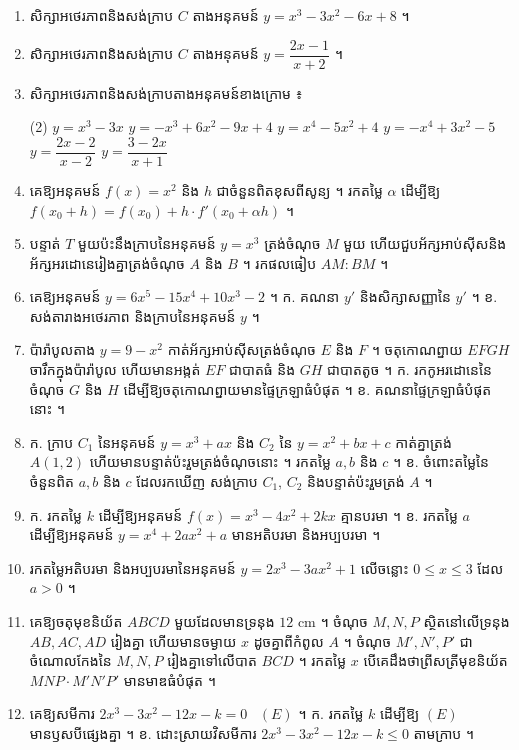 \begin{enumerate}[1]
  \item សិក្សាអថេរភាពនិងសង់ក្រាប $C$ តាងអនុគមន៍ $y = x^3 - 3x^2 - 6x + 8$ ។
  \item សិក្សាអថេរភាពនិងសង់ក្រាប $C$ តាងអនុគមន៍ $y = \dfrac{2x - 1}{x + 2}$ ។
  \item សិក្សាអថេរភាពនិងសង់ក្រាបតាងអនុគមន៍ខាងក្រោម ៖
  \begin{tasks}(2)
    \task $y = x^3 - 3x$
    \task $y = -x^3 + 6x^2 - 9x + 4$
    \task $y = x^4 - 5x^2 + 4$
    \task $y = -x^4 + 3x^2 - 5$
    \task $y = \dfrac{2x - 2}{x - 2}$
    \task $y = \dfrac{3 - 2x}{x + 1}$
  \end{tasks}
  \item គេឱ្យអនុគមន៍ $f(x) = x^2$ និង $h$ ជាចំនួនពិតខុសពីសូន្យ ។ រកតម្លៃ $\alpha$ ដើម្បីឱ្យ $f(x_0 + h) = f(x_0) + h\cdot f'(x_0 + \alpha h)$ ។
  \item បន្ទាត់ $T$ មួយប៉ះនឹងក្រាបនៃអនុគមន៍ $y = x^3$ ត្រង់ចំណុច $M$ មួយ ហើយជួបអ័ក្សអាប់ស៊ីសនិងអ័ក្សអរដោនេរៀងគ្នាត្រង់ចំណុច $A$ និង $B$ ។ រកផលធៀប $AM : BM$ ។
  \item គេឱ្យអនុគមន៍ $y = 6x^5 - 15x^4 + 10x^3 - 2$ ។ \quad ក. គណនា $y'$ និងសិក្សាសញ្ញានៃ $y'$ ។ \quad ខ. សង់តារាងអថេរភាព និងក្រាបនៃអនុគមន៍ $y$ ។
  \item ប៉ារ៉ាបូលតាង $y = 9 - x^2$ កាត់អ័ក្សអាប់ស៊ីសត្រង់ចំណុច $E$ និង $F$ ។ ចតុកោណព្នាយ $EFGH$ ចារឹកក្នុងប៉ារ៉ាបូល ហើយមានអង្កត់ $EF$ ជាបាតធំ និង $GH$ ជាបាតតូច ។ \quad ក. រកកូអរដោនេនៃចំណុច $G$ និង $H$ ដើម្បីឱ្យចតុកោណព្នាយមានផ្ទៃក្រឡាធំបំផុត ។ \quad ខ. គណនាផ្ទៃក្រឡាធំបំផុតនោះ ។
  \item ក. ក្រាប $C_1$ នៃអនុគមន៍ $y = x^3 + ax$ និង $C_2$ នៃ $y = x^2 + bx + c$ កាត់គ្នាត្រង់ $A(1, 2)$ ហើយមានបន្ទាត់ប៉ះរួមត្រង់ចំណុចនោះ ។ រកតម្លៃ $a, b$ និង $c$ ។ \quad ខ. ចំពោះតម្លៃនៃចំនួនពិត $a, b$ និង $c$ ដែលរកឃើញ សង់ក្រាប $C_1$, $C_2$ និងបន្ទាត់ប៉ះរួមត្រង់ $A$ ។
  \item ក. រកតម្លៃ $k$ ដើម្បីឱ្យអនុគមន៍ $f(x) = x^3 - 4x^2 + 2kx$ គ្មានបរមា ។ \quad ខ. រកតម្លៃ $a$ ដើម្បីឱ្យអនុគមន៍ $y = x^4 + 2ax^2 + a$ មានអតិបរមា និងអប្បបរមា ។
  \item រកតម្លៃអតិបរមា និងអប្បបរមានៃអនុគមន៍ $y = 2x^3 - 3ax^2 + 1$ លើចន្លោះ $0 \le x \le 3$ ដែល $a > 0$ ។
  \item គេឱ្យចតុមុខនិយ័ត $ABCD$ មួយដែលមានទ្រនុង $12$ cm ។ ចំណុច $M, N, P$ ស្ថិតនៅលើទ្រនុង $AB, AC, AD$ រៀងគ្នា ហើយមានចម្ងាយ $x$ ដូចគ្នាពីកំពូល $A$ ។ ចំណុច $M', N', P'$ ជាចំណោលកែងនៃ $M, N, P$ រៀងគ្នាទៅលើបាត $BCD$ ។ រកតម្លៃ $x$ បើគេដឹងថាព្រីសត្រីមុខនិយ័ត $MNP\cdot M'N'P'$ មានមាឌធំបំផុត ។
  \item គេឱ្យសមីការ $2x^3 - 3x^2 - 12x - k = 0$ \ $(E)$ ។ \quad ក. រកតម្លៃ $k$ ដើម្បីឱ្យ $(E)$ មានឫសបីផ្សេងគ្នា ។ \quad ខ. ដោះស្រាយវិសមីការ $2x^3 - 3x^2 - 12x - k \le 0$ តាមក្រាប ។

\end{enumerate}
